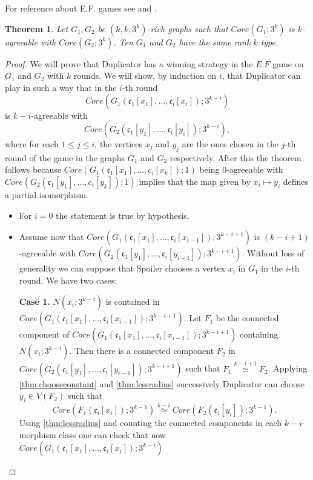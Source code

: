\documentclass[11pt,notitlepage,a4paper]{article}
\newtheorem{theorem}{Theorem}[section]
\theoremstyle{definition}
\newcommand{\cc}{\mathfrak{c}}
\newcommand{\morph}[1]{\stackrel{#1}{\simeq}}
\begin{document}
For reference about E.F. games see \cite{finitemodeltheory1} and \cite{finitemodeltheory2}.

\begin{theorem} 
	Let $G_1, G_2$ be $(k,k,3^k)$-rich graphs such that $Core(G_1;3^k)$ is $k$-agreeable
	with $Core(G_2;3^k)$. Ten $G_1$ and $G_2$ have the same rank $k$ type.
\end{theorem}
\begin{proof}
	We will prove that Duplicator has a winning strategy in 
	the $E.F$ game on $G_1$ and $G_2$ with $k$ rounds. 
	We will show, by induction on $i$, that Duplicator can play in such a way
	that in the $i$-th round
	\[Core(G_1(\cc_1[x_1],\dots,\cc_i[x_i]);3^{k-i}) \]
	is $k-i$-agreeable with  
	\[ Core(G_2(\cc_1[y_1],\dots,\cc_i[y_i]);3^{k-i}), \]
	where for each $1\leq j \leq i$, the vertices
	$x_j$ and $y_j$ are the ones chosen in the $j$-th 
	round of the game in the graphs $G_1$ and $G_2$ respectively. 
	After this the theorem
	follows because
	$Core(G_1(\cc_1[x_1],\dots,c_i[x_k]);1)$ being $0$-agreeable with
	$Core(G_2(\cc_1[y_1],\dots,c_i[y_k]);1)$ implies that
	the map given by $x_i\mapsto y_i$ defines a partial isomorphism. \par
	\begin{itemize}[leftmargin=*]
		\item For $i=0$ the statement is true by hypothesis. 
		\item Assume now that $Core(G_1(\cc_1[x_1],\dots,\cc_i[x_{i-1}]);3^{k-i+1})$
		is $(k-i+1)$-agreeable with $Core(G_2(\cc_1[y_1],\dots, \cc_i[y_{i-1}]); 3^{k-i+1})$.
		Without loss of generality we can suppose that Spoiler chooses a vertex 
		$x_i$ in $G_1$ in the $i$-th round. We have two cases: \par
		\textbf{Case 1.} $N(x_i;3^{k-i})$ is contained in 
			$Core(G_1(\cc_1[x_1],\dots,\cc_i[x_{i-1}]);3^{k-i+1})$.
			Let $F_1$ be the connected component of 
			$Core(G_1(\cc_1[x_1],\dots,\cc_i[x_{i-1}]);3^{k-i+1})$
			containing $N(x_i;3^{k-i})$. Then there is a connected component $F_2$
			in \\ 
			$Core(G_2(\cc_1[y_1],\dots,\cc_i[y_{i-1}]);3^{k-i+1})$ such that
			$F_1 \morph{k-i+1} F_2$. Applying \cref{thm:chooseconstant} and 
			\cref{thm:lessradius} successively Duplicator can choose
			$y_i\in V(F_2)$ such that 
			\[ Core(F_1(\cc_i[x_i]); 3^{k-1})\morph{k-i} Core(F_2(\cc_i[y_i]); 3^{k-1}).\]
			Using \cref{thm:lessradius} 
			and counting the connected components in each $k-i$-morphism class
			one can check that now $Core(G_1(\cc_1[x_1],\dots,\cc_i[x_i]);3^{k-i})$

\end{itemize}
\end{proof}
\end{document}
